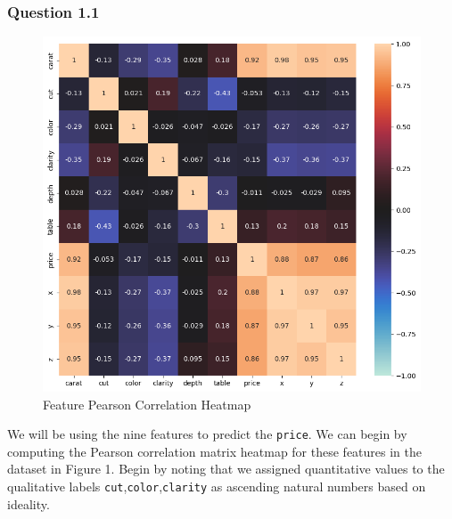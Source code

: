 \documentclass[11pt,letterpaper]{article}
\begin{document}

\subsubsection*{Question 1.1}
\begin{figure}[H]
    \centering
   \includegraphics[width=0.5\linewidth]{../Figures/Question-1/datasetCorrHeatmap.png}
   \caption{Feature Pearson Correlation Heatmap}
   \label{fig:corr_hm}
\end{figure}

We will be using the nine features to predict the \texttt{price}. We can begin by 
computing the Pearson correlation matrix heatmap for these features in 
the dataset in Figure 1. Begin by noting that we assigned quantitative values to
the qualitative labels \texttt{cut},\texttt{color},\texttt{clarity} as ascending 
natural numbers based on ideality.\\
\end{document}

